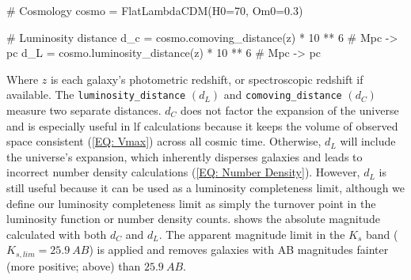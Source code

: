 \vspace{1.5cm}
\begin{python}    
    # Cosmology
    cosmo = FlatLambdaCDM(H0=70, Om0=0.3)
    
    # Luminosity distance
    d_c = cosmo.comoving_distance(z) * 10 ** 6 # Mpc -> pc
    d_L = cosmo.luminosity_distance(z) * 10 ** 6 # Mpc -> pc
\end{python}

Where $z$ is each galaxy's photometric redshift, or spectroscopic redshift if available. The \texttt{luminosity\_distance} $(d_L)$ and \texttt{comoving\_distance} $(d_C)$ measure two separate distances. $d_C$ does not factor the expansion of the universe and is especially useful in \gls{lf} calculations because it keeps the volume of observed space consistent (\cref{EQ: Vmax}) across all cosmic time. Otherwise, $d_L$ will include the universe's expansion, which inherently disperses galaxies and leads to incorrect number density calculations (\cref{EQ: Number Density}). However, $d_L$ is still useful because it can be used as a luminosity completeness limit, although we define our luminosity completeness limit as simply the turnover point in the luminosity function or number density counts.  shows the absolute magnitude calculated with both $d_C$ and $d_L$. The apparent magnitude limit in the $K_{s}$ band ($K_{s,lim} = 25.9\ AB$) is applied and removes galaxies with AB magnitudes fainter (more positive; above) than $25.9\ AB$.


